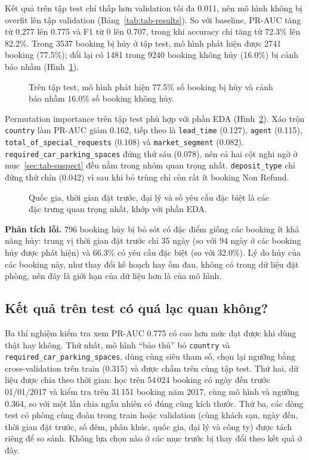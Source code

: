 Kết quả trên tập test chỉ thấp hơn validation tối đa 0.011, nên mô hình không bị overfit lên tập validation (Bảng~\ref{tab:tab-results}).
So với baseline, PR-AUC tăng từ 0.277 lên 0.775 và F1 từ 0 lên 0.707, trong khi accuracy chỉ tăng từ 72.3\% lên 82.2\%.
Trong 3537 booking bị hủy ở tập test, mô hình phát hiện được 2741 booking (77.5\%); đổi lại có 1481 trong 9240 booking
không hủy (16.0\%) bị cảnh báo nhầm (Hình~\ref{fig:tab-confusion}).

\begin{figure}[H]
\centering
{}
\caption{Trên tập test, mô hình phát hiện 77.5\% số booking bị hủy và cảnh báo nhầm 16.0\% số booking không hủy.}
\label{fig:tab-confusion}
\end{figure}

Permutation importance trên tập test phù hợp với phần EDA (Hình~\ref{fig:tab-importance}). Xáo trộn \texttt{country} làm PR-AUC giảm 0.162,
tiếp theo là \texttt{lead\_time} (0.127), \texttt{agent} (0.115), \texttt{total\_of\_special\_requests} (0.108) và
\texttt{market\_segment} (0.082). \texttt{required\_car\_parking\_spaces} đứng thứ sáu (0.078), nên cả hai cột nghi ngờ ở
mục~\ref{sec:tab-suspect} đều nằm trong nhóm quan trọng nhất. \texttt{deposit\_type} chỉ đứng thứ chín (0.042) vì sau khi bỏ trùng
chỉ còn rất ít booking Non Refund.

\begin{figure}[H]
\centering
{}
\caption{Quốc gia, thời gian đặt trước, đại lý và số yêu cầu đặc biệt là các đặc trưng quan trọng nhất, khớp với phần EDA.}
\label{fig:tab-importance}
\end{figure}

\textbf{Phân tích lỗi.} 796 booking hủy bị bỏ sót có đặc điểm giống các booking ít khả năng hủy: trung vị thời gian đặt trước
chỉ 35 ngày (so với 94 ngày ở các booking hủy được phát hiện) và 66.3\% có yêu cầu đặc biệt (so với 32.0\%).
Lý do hủy của các booking này, như thay đổi kế hoạch hay ốm đau, không có trong dữ liệu đặt phòng,
nên đây là giới hạn của dữ liệu hơn là của mô hình.

\subsection{Kết quả trên test có quá lạc quan không?}
\label{sec:tab-robust}
Ba thí nghiệm kiểm tra xem PR-AUC 0.775 có cao hơn mức đạt được khi dùng thật hay không. Thứ nhất, mô hình ``bảo thủ'' bỏ
\texttt{country} và \texttt{required\_car\_parking\_spaces}, dùng cùng siêu tham số, chọn lại ngưỡng bằng cross-validation trên train
(0.315) và được chấm trên cùng tập test. Thứ hai, dữ liệu được chia theo thời gian: học trên 54\,024 booking có ngày đến trước 01/01/2017
và kiểm tra trên 31\,151 booking năm 2017, cùng mô hình và ngưỡng 0.364, so với một lần chia ngẫu nhiên có đúng cùng kích thước.
Thứ ba, các dòng test có phòng cùng đoàn trong train hoặc validation (cùng khách sạn, ngày đến, thời gian đặt trước, số đêm, phân khúc,
quốc gia, đại lý và công ty) được tách riêng để so sánh. Không lựa chọn nào ở các mục trước bị thay đổi theo kết quả ở đây.

